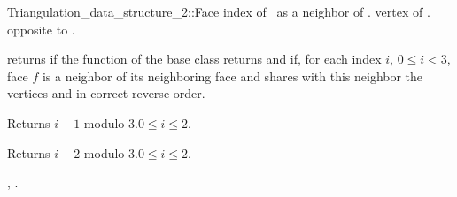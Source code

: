 \begin{ccRefConcept}{Triangulation_data_structure_2::Face}
{index of \ccVar\ as a neighbor of \ccVar.}
\ccGlue
{}
{vertex of \ccVar.} opposite to  \ccVar.


\begin{ccAdvanced}

{returns  if  the function 
 of the base class
returns  and if, for each index $i$, $0 \le i < 3$,
face $f$ is a neighbor of its neighboring face 
and shares with this neighbor the  vertices  and 
in correct reverse order.}

\end{ccAdvanced}


{Returns $i+1$ modulo 3.\ccPrecond $0\leq i \leq 2$.}

{Returns $i+2$ modulo 3.\ccPrecond $0\leq i \leq 2$.}



\ccHasModels
{}


\ccSeeAlso
{}
,
.


\end{ccRefConcept}


